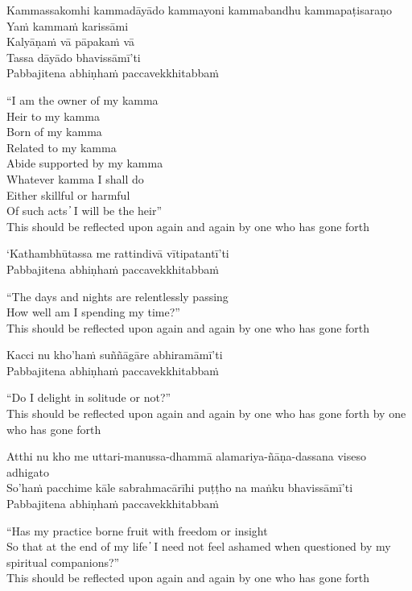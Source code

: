 Kammassakomhi kammadāyādo kammayoni kammabandhu kammapaṭisaraṇo\\
Yaṁ kammaṁ karissāmi\\
Kalyāṇaṁ vā pāpakaṁ vā\\
Tassa dāyādo bhavissāmī'ti\\
Pabbajitena abhiṇhaṁ paccavekkhitabbaṁ

\begin{english}
  “I am the owner of my kamma\\
  Heir to my kamma\\
  Born of my kamma\\
  Related to my kamma\\
  Abide supported by my kamma\\
  Whatever kamma I shall do\\
  Either skillful or harmful\\
  Of such acts  ̓  I will be the heir”\\
  This should be reflected upon again and again by one who has gone forth
\end{english}

`Kathambhūtassa me rattindivā vītipatantī'ti\\
Pabbajitena abhiṇhaṁ paccavekkhitabbaṁ

\begin{english}
  “The days and nights are relentlessly passing\\
  How well am I spending my time?”\\
  This should be reflected upon again and again by one who has gone forth
\end{english}

Kacci nu kho'haṁ suññāgāre abhiramāmī'ti\\
Pabbajitena abhiṇhaṁ paccavekkhitabbaṁ

\begin{english}
  “Do I delight in solitude or not?”\\
  This should be reflected upon again and again by one who has gone forth by one who has gone forth
\end{english}

Atthi nu kho me uttari-manussa-dhammā alamariya-ñāṇa-dassana viseso adhigato\\
So’haṁ pacchime kāle sabrahmacārīhi puṭṭho na maṅku bhavissāmī’ti\\
Pabbajitena abhiṇhaṁ paccavekkhitabbaṁ

\begin{english}
  “Has my practice borne fruit with freedom or insight\\
  So that at the end of my life  ̓  I need not feel ashamed when questioned by my spiritual companions?”\\
  This should be reflected upon again and again by one who has gone forth
\end{english}

